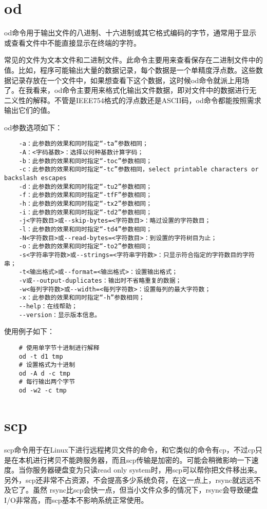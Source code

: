 \documentclass[a4paper,left=2.5cm,right=2.5cm,11pt]{article}
\begin{document}
\section{od}
	od命令用于输出文件的八进制、十六进制或其它格式编码的字节，通常用于显示或查看文件中不能直接显示在终端的字符。\par
	常见的文件为文本文件和二进制文件。此命令主要用来查看保存在二进制文件中的值。比如，程序可能输出大量的数据记录，每个数据是一个单精度浮点数。这些数据记录存放在一个文件中，如果想查看下这个数据，这时候od命令就派上用场了。在我看来，od命令主要用来格式化输出文件数据，即对文件中的数据进行无二义性的解释。不管是IEEE754格式的浮点数还是ASCII码，od命令都能按照需求输出它们的值。\par

	od参数选项如下：
	\begin{lstlisting}
	-a：此参数的效果和同时指定“-ta”参数相同； 
	-A：<字码基数>：选择以何种基数计算字码； 
	-b：此参数的效果和同时指定“-toc”参数相同； 
	-c：此参数的效果和同时指定“-tc”参数相同，select printable characters or backslash escapes 
	-d：此参数的效果和同时指定“-tu2”参数相同； 
	-f：此参数的效果和同时指定“-tfF”参数相同； 
	-h：此参数的效果和同时指定“-tx2”参数相同； 
	-i：此参数的效果和同时指定“-td2”参数相同； 
	-j<字符数目>或--skip-bytes=<字符数目>：略过设置的字符数目； 
	-l：此参数的效果和同时指定“-td4”参数相同； 
	-N<字符数目>或--read-bytes=<字符数目>：到设置的字符树目为止； 
	-o：此参数的效果和同时指定“-to2”参数相同； 
	-s<字符串字符数>或--strings=<字符串字符数>：只显示符合指定的字符数目的字符串； 
	-t<输出格式>或--format=<输出格式>：设置输出格式； 
	-v或--output-duplicates：输出时不省略重复的数据； 
	-w<每列字符数>或--width=<每列字符数>：设置每列的最大字符数； 
	-x：此参数的效果和同时指定“-h”参数相同； 
	--help：在线帮助； 
	--version：显示版本信息。
	\end{lstlisting}

	使用例子如下：
	\begin{lstlisting}
	# 使用单字节十进制进行解释
	od -t d1 tmp
	# 设置格式为十进制
	od -A d -c tmp
	# 每行输出两个字节
	od -w2 -c tmp
	\end{lstlisting}

\section{scp}
	scp命令用于在Linux下进行远程拷贝文件的命令，和它类似的命令有cp，不过cp只是在本机进行拷贝不能跨服务器，而且scp传输是加密的。可能会稍微影响一下速度。当你服务器硬盘变为只读read only system时，用scp可以帮你把文件移出来。另外，scp还非常不占资源，不会提高多少系统负荷，在这一点上，rsync就远远不及它了。虽然 rsync比scp会快一点，但当小文件众多的情况下，rsync会导致硬盘I/O非常高，而scp基本不影响系统正常使用。\par
\end{document}
